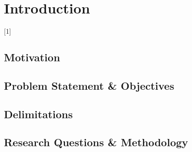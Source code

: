 \chapter*{Introduction}
\setcounter{page}{1}

\begin{chapterabstract}
	\lipsum[1]
\end{chapterabstract}

\lipsum[2][1-4]{} [1]

\lipsum[4]

\section{Motivation}

\section{Problem Statement \& Objectives}

\section{Delimitations}

\section{Research Questions \& Methodology}

